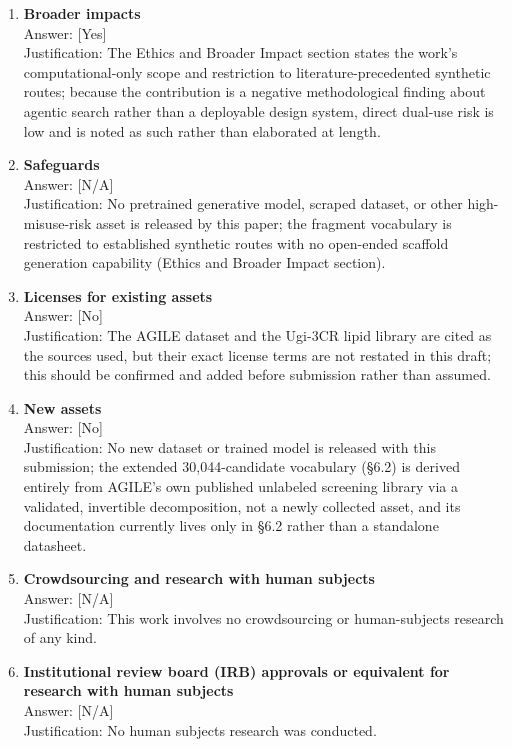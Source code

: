 \documentclass{article}
\begin{document}
\begin{enumerate}
\item \textbf{Broader impacts}\\
Answer: [Yes]\\
Justification: The Ethics and Broader Impact section states the work's computational-only scope and
restriction to literature-precedented synthetic routes; because the contribution is a negative
methodological finding about agentic search rather than a deployable design system, direct
dual-use risk is low and is noted as such rather than elaborated at length.

\item \textbf{Safeguards}\\
Answer: [N/A]\\
Justification: No pretrained generative model, scraped dataset, or other high-misuse-risk asset is
released by this paper; the fragment vocabulary is restricted to established synthetic routes with
no open-ended scaffold generation capability (Ethics and Broader Impact section).

\item \textbf{Licenses for existing assets}\\
Answer: [No]\\
Justification: The AGILE dataset \citep{xu2024agile} and the Ugi-3CR lipid library
\citep{xu2023ugi} are cited as the sources used, but their exact license terms are not restated in
this draft; this should be confirmed and added before submission rather than assumed.

\item \textbf{New assets}\\
Answer: [No]\\
Justification: No new dataset or trained model is released with this submission; the extended
30,044-candidate vocabulary (\S6.2) is derived entirely from AGILE's own published unlabeled
screening library via a validated, invertible decomposition, not a newly collected asset, and its
documentation currently lives only in \S6.2 rather than a standalone datasheet.

\item \textbf{Crowdsourcing and research with human subjects}\\
Answer: [N/A]\\
Justification: This work involves no crowdsourcing or human-subjects research of any kind.

\item \textbf{Institutional review board (IRB) approvals or equivalent for research with human
subjects}\\
Answer: [N/A]\\
Justification: No human subjects research was conducted.


\end{enumerate}
\end{document}

